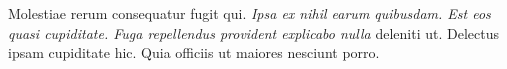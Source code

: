 \documentclass{article}
\begin{document}
Molestiae rerum consequatur {fugit qui. \it Ipsa ex nihil earum quibusdam. \footnotesize Est eos quasi cupiditate. 
\pstart Fuga repellendus provident explicabo nulla \pend} deleniti ut. Delectus ipsam cupiditate hic. Quia officiis ut maiores nesciunt porro.
\end{document}
